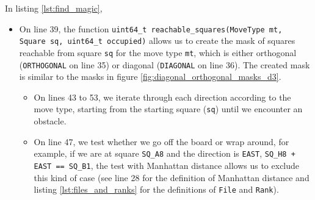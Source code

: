 \documentclass[12pt,a4paper,twoside,openright]{book}
\begin{document}
In listing \ref{lst:find_magic},

\begin{itemize}

\item On line 39, the function \texttt{uint64_t reachable_squares(MoveType mt, Square sq, uint64_t occupied)} allows us to create the mask of squares reachable from square \texttt{sq} for the move type \texttt{mt}, which is either orthogonal (\texttt{ORTHOGONAL} on line 35) or diagonal (\texttt{DIAGONAL} on line 36). The created mask is similar to the masks in figure \ref{fig:diagonal_orthogonal_masks_d3}.
\begin{itemize}
\item On lines 43 to 53, we iterate through each direction according to the move type, starting from the starting square (\texttt{sq}) until we encounter an obstacle.
\item On line 47, we test whether we go off the board or wrap around, for example, if we are at square \texttt{SQ_A8} and the direction is \texttt{EAST}, \texttt{SQ_H8 + EAST == SQ_B1}, the test with Manhattan distance allows us to exclude this kind of case (see line 28 for the definition of Manhattan distance and listing \ref{lst:files_and_ranks} for the definitions of \texttt{File} and \texttt{Rank}).

\end{itemize}
\end{itemize}
\end{document}
